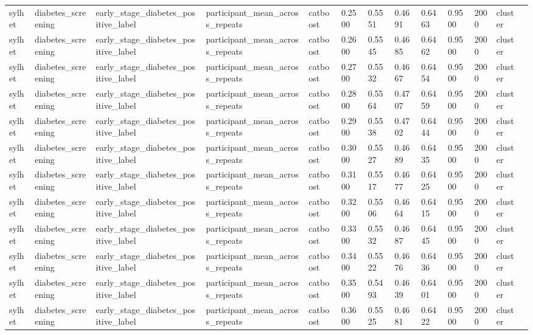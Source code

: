 \begin{tabular}{lllllllllllll}
sylhet & diabetes\_screening & early\_stage\_diabetes\_positive\_label & participant\_mean\_across\_repeats & catboost & 0.2500 & 0.5551 & 0.4691 & 0.6463 & 0.9500 & 2000 & cluster &  \\
sylhet & diabetes\_screening & early\_stage\_diabetes\_positive\_label & participant\_mean\_across\_repeats & catboost & 0.2600 & 0.5545 & 0.4685 & 0.6462 & 0.9500 & 2000 & cluster &  \\
sylhet & diabetes\_screening & early\_stage\_diabetes\_positive\_label & participant\_mean\_across\_repeats & catboost & 0.2700 & 0.5532 & 0.4667 & 0.6454 & 0.9500 & 2000 & cluster &  \\
sylhet & diabetes\_screening & early\_stage\_diabetes\_positive\_label & participant\_mean\_across\_repeats & catboost & 0.2800 & 0.5564 & 0.4707 & 0.6459 & 0.9500 & 2000 & cluster &  \\
sylhet & diabetes\_screening & early\_stage\_diabetes\_positive\_label & participant\_mean\_across\_repeats & catboost & 0.2900 & 0.5538 & 0.4702 & 0.6444 & 0.9500 & 2000 & cluster &  \\
sylhet & diabetes\_screening & early\_stage\_diabetes\_positive\_label & participant\_mean\_across\_repeats & catboost & 0.3000 & 0.5527 & 0.4689 & 0.6435 & 0.9500 & 2000 & cluster &  \\
sylhet & diabetes\_screening & early\_stage\_diabetes\_positive\_label & participant\_mean\_across\_repeats & catboost & 0.3100 & 0.5517 & 0.4677 & 0.6425 & 0.9500 & 2000 & cluster &  \\
sylhet & diabetes\_screening & early\_stage\_diabetes\_positive\_label & participant\_mean\_across\_repeats & catboost & 0.3200 & 0.5506 & 0.4664 & 0.6415 & 0.9500 & 2000 & cluster &  \\
sylhet & diabetes\_screening & early\_stage\_diabetes\_positive\_label & participant\_mean\_across\_repeats & catboost & 0.3300 & 0.5532 & 0.4687 & 0.6445 & 0.9500 & 2000 & cluster &  \\
sylhet & diabetes\_screening & early\_stage\_diabetes\_positive\_label & participant\_mean\_across\_repeats & catboost & 0.3400 & 0.5522 & 0.4676 & 0.6436 & 0.9500 & 2000 & cluster &  \\
sylhet & diabetes\_screening & early\_stage\_diabetes\_positive\_label & participant\_mean\_across\_repeats & catboost & 0.3500 & 0.5493 & 0.4639 & 0.6401 & 0.9500 & 2000 & cluster &  \\
sylhet & diabetes\_screening & early\_stage\_diabetes\_positive\_label & participant\_mean\_across\_repeats & catboost & 0.3600 & 0.5525 & 0.4681 & 0.6422 & 0.9500 & 2000 & cluster &  \\

\end{tabular}
